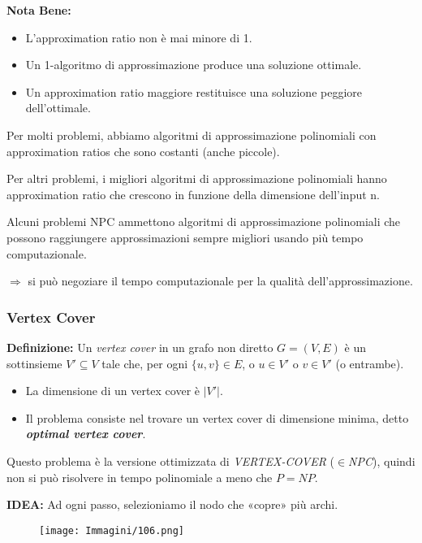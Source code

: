 \documentclass{article}
\begin{document}
\textbf{Nota Bene:}
\begin{itemize}
    \item L’approximation ratio non è mai minore di 1.
    \item Un 1-algoritmo di approssimazione produce una soluzione ottimale.
    \item Un approximation ratio maggiore restituisce una soluzione peggiore dell’ottimale.
\end{itemize}

Per molti problemi, abbiamo algoritmi di approssimazione polinomiali con
approximation ratios che sono costanti (anche piccole).

Per altri problemi, i migliori algoritmi di approssimazione polinomiali hanno
approximation ratio che crescono in funzione della dimensione dell’input n.

Alcuni problemi NPC ammettono algoritmi di approssimazione polinomiali che
possono raggiungere approssimazioni sempre migliori usando più tempo
computazionale.

$\Rightarrow$ si può negoziare il tempo computazionale per la qualità dell’approssimazione.

\subsubsection{Vertex Cover}
\textbf{Definizione:} Un \textit{vertex cover} in un grafo non diretto $G = (V, E)$ è un sottinsieme $V' \subseteq V$ tale che, per ogni $\{u, v\} \in E$, o $u \in V'$ o $v \in V'$ (o entrambe).

\begin{itemize}
    \item La dimensione di un vertex cover è $|V'|$.
    \item Il problema consiste nel trovare un vertex cover di dimensione minima, detto \textbf{\textit{optimal vertex cover}}.
\end{itemize}

\begin{tcolorbox}[colback=red!10!white, colframe=red!50!black, title=Osservazione]
    Questo problema è la versione ottimizzata di \textit{VERTEX-COVER} ($\in$\textit{NPC}), quindi non si può risolvere in tempo polinomiale a meno che $P = NP$.
\end{tcolorbox}

\textbf{IDEA:} Ad ogni passo, selezioniamo il nodo che «copre» più archi.

\begin{figure}[H]
    \centering
    \texttt{[image: Immagini/106.png]}
    \label{algo_vertex_cover}
\end{figure}
\end{document}
